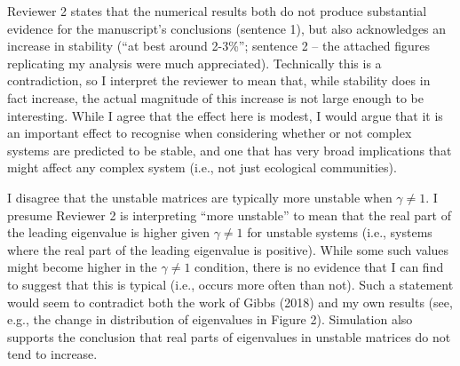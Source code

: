 \documentclass[]{article}
\begin{document}
Reviewer 2 states that the numerical results both do not produce
substantial evidence for the manuscript's conclusions (sentence 1), but
also acknowledges an increase in stability (``at best around 2-3\%'';
sentence 2 -- the attached figures replicating my analysis were much
appreciated). Technically this is a contradiction, so I interpret the
reviewer to mean that, while stability does in fact increase, the actual
magnitude of this increase is not large enough to be interesting. While
I agree that the effect here is modest, I would argue that it is an
important effect to recognise when considering whether or not complex
systems are predicted to be stable, and one that has very broad
implications that might affect any complex system (i.e., not just
ecological communities).

I disagree that the unstable matrices are typically more unstable when
\(\gamma \neq 1\). I presume Reviewer 2 is interpreting ``more
unstable'' to mean that the real part of the leading eigenvalue is
higher given \(\gamma \neq 1\) for unstable systems (i.e., systems where
the real part of the leading eigenvalue is positive). While some such
values might become higher in the \(\gamma \neq 1\) condition, there is
no evidence that I can find to suggest that this is typical (i.e.,
occurs more often than not). Such a statement would seem to contradict
both the work of Gibbs (2018) and my own results (see, e.g., the change
in distribution of eigenvalues in Figure 2). Simulation also supports
the conclusion that real parts of eigenvalues in unstable matrices do
not tend to increase.
\end{document}
